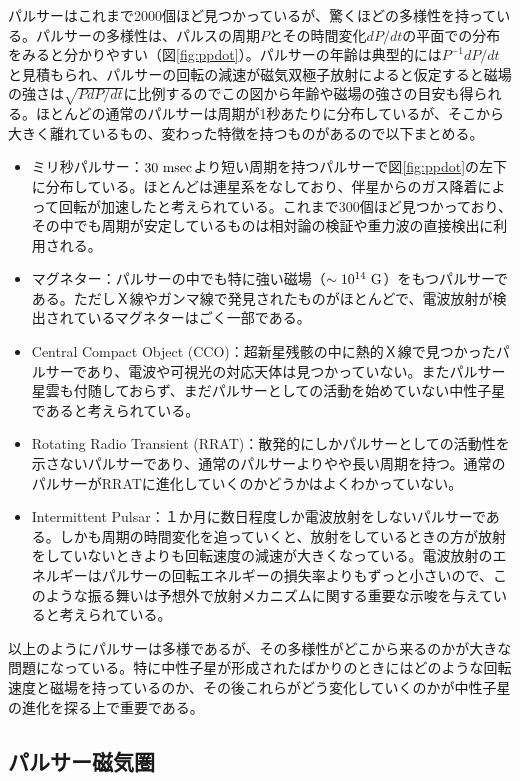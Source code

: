 パルサーはこれまで2000個ほど見つかっているが、驚くほどの多様性を持っている。パルサーの多様性は、パルスの周期$P$とその時間変化$dP/dt$の平面での分布をみると分かりやすい（図\ref{fig:ppdot}）。パルサーの年齢は典型的には$P^{-1}dP/dt$と見積もられ、パルサーの回転の減速が磁気双極子放射によると仮定すると磁場の強さは$\sqrt{P dP/dt}$に比例するのでこの図から年齢や磁場の強さの目安も得られる。ほとんどの通常のパルサーは周期が1秒あたりに分布しているが、そこから大きく離れているもの、変わった特徴を持つものがあるので以下まとめる。
\begin{itemize}
\item ミリ秒パルサー：$30~{\rm msec}$より短い周期を持つパルサーで図\ref{fig:ppdot}の左下に分布している。ほとんどは連星系をなしており、伴星からのガス降着によって回転が加速したと考えられている。これまで300個ほど見つかっており、その中でも周期が安定しているものは相対論の検証や重力波の直接検出に利用される。
\item マグネター：パルサーの中でも特に強い磁場（$\sim 10^{14}~{\rm G}$）をもつパルサーである。ただしＸ線やガンマ線で発見されたものがほとんどで、電波放射が検出されているマグネターはごく一部である。
\item Central Compact Object (CCO)：超新星残骸の中に熱的Ｘ線で見つかったパルサーであり、電波や可視光の対応天体は見つかっていない。またパルサー星雲も付随しておらず、まだパルサーとしての活動を始めていない中性子星であると考えられている。
\item Rotating Radio Transient (RRAT)：散発的にしかパルサーとしての活動性を示さないパルサーであり、通常のパルサーよりやや長い周期を持つ。通常のパルサーがRRATに進化していくのかどうかはよくわかっていない。
\item Intermittent Pulsar：１か月に数日程度しか電波放射をしないパルサーである。しかも周期の時間変化を追っていくと、放射をしているときの方が放射をしていないときよりも回転速度の減速が大きくなっている。電波放射のエネルギーはパルサーの回転エネルギーの損失率よりもずっと小さいので、このような振る舞いは予想外で放射メカニズムに関する重要な示唆を与えていると考えられている。
\end{itemize}
以上のようにパルサーは多様であるが、その多様性がどこから来るのかが大きな問題になっている。特に中性子星が形成されたばかりのときにはどのような回転速度と磁場を持っているのか、その後これらがどう変化していくのかが中性子星の進化を探る上で重要である。


\subsection{パルサー磁気圏}

